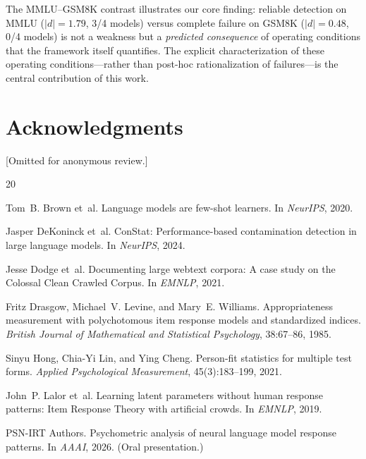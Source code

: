 \documentclass[11pt]{article}
\begin{document}
The MMLU--GSM8K contrast illustrates our core finding: reliable detection on MMLU ($|d| = 1.79$, 3/4 models) versus complete failure on GSM8K ($|d| = 0.48$, 0/4 models) is not a weakness but a \emph{predicted consequence} of operating conditions that the framework itself quantifies.
The explicit characterization of these operating conditions---rather than post-hoc rationalization of failures---is the central contribution of this work.

\section*{Acknowledgments}
[Omitted for anonymous review.]



\begin{thebibliography}{20}

Tom~B. Brown et~al.
\newblock Language models are few-shot learners.
\newblock In \emph{NeurIPS}, 2020.

Jasper DeKoninck et~al.
\newblock ConStat: Performance-based contamination detection in large language models.
\newblock In \emph{NeurIPS}, 2024.

Jesse Dodge et~al.
\newblock Documenting large webtext corpora: A case study on the Colossal Clean Crawled Corpus.
\newblock In \emph{EMNLP}, 2021.

Fritz Drasgow, Michael~V. Levine, and Mary~E. Williams.
\newblock Appropriateness measurement with polychotomous item response models and standardized indices.
\newblock \emph{British Journal of Mathematical and Statistical Psychology}, 38:67--86, 1985.

Sinyu Hong, Chia-Yi Lin, and Ying Cheng.
\newblock Person-fit statistics for multiple test forms.
\newblock \emph{Applied Psychological Measurement}, 45(3):183--199, 2021.

John~P. Lalor et~al.
\newblock Learning latent parameters without human response patterns: Item Response Theory with artificial crowds.
\newblock In \emph{EMNLP}, 2019.

{PSN-IRT Authors}.
\newblock Psychometric analysis of neural language model response patterns.
\newblock In \emph{AAAI}, 2026. (Oral presentation.)


\end{thebibliography}
\end{document}
